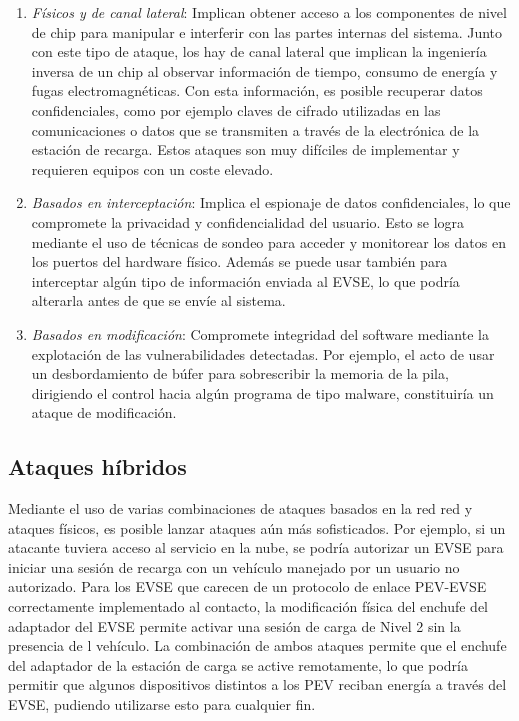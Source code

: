 \documentclass[12pt,a4paper,onecolumn,oneside]{report}
\begin{document}
\begin{enumerate}

\item \textit{Físicos y de canal lateral}: Implican obtener acceso a los componentes de nivel de chip para manipular e interferir con las partes internas del sistema. Junto con este tipo de ataque, los hay de canal lateral que implican la ingeniería inversa de un chip al observar información de tiempo, consumo de energía y fugas electromagnéticas. Con esta información, es posible recuperar datos confidenciales, como por ejemplo claves de cifrado utilizadas en las comunicaciones o datos que se transmiten a través de la electrónica de la estación de recarga. Estos ataques son muy difíciles de implementar y requieren equipos con un coste elevado.

\item \textit{Basados en interceptación}: Implica el espionaje de datos confidenciales, lo que compromete la privacidad y confidencialidad del usuario. Esto se logra mediante el uso de técnicas de sondeo para acceder y monitorear los datos en los puertos del hardware físico. Además se puede usar también para interceptar algún tipo de información enviada al EVSE, lo que podría alterarla antes de que se envíe al sistema.

\item \textit{Basados en modificación}: Compromete integridad del software mediante la explotación de las vulnerabilidades detectadas. Por ejemplo, el acto de usar un desbordamiento de búfer para sobrescribir la memoria de la pila, dirigiendo el control hacia algún programa de tipo malware, constituiría un ataque de modificación.

\end{enumerate}



\subsection{Ataques híbridos}

Mediante el uso de varias combinaciones de ataques basados en la red red y ataques físicos, es posible lanzar ataques aún más sofisticados. Por ejemplo, si un atacante tuviera acceso al servicio en la nube, se podría autorizar un EVSE para iniciar una sesión de recarga con un vehículo manejado por un usuario no autorizado. Para los EVSE que carecen de un protocolo de enlace PEV-EVSE correctamente implementado al contacto, la modificación física del enchufe del adaptador del EVSE permite activar una sesión de carga de Nivel 2 sin la presencia de l vehículo. La combinación de ambos ataques permite que el enchufe del adaptador de la estación de carga se active remotamente, lo que podría permitir que algunos dispositivos distintos a los PEV reciban energía a través del EVSE, pudiendo utilizarse esto para cualquier fin.
\end{document}

